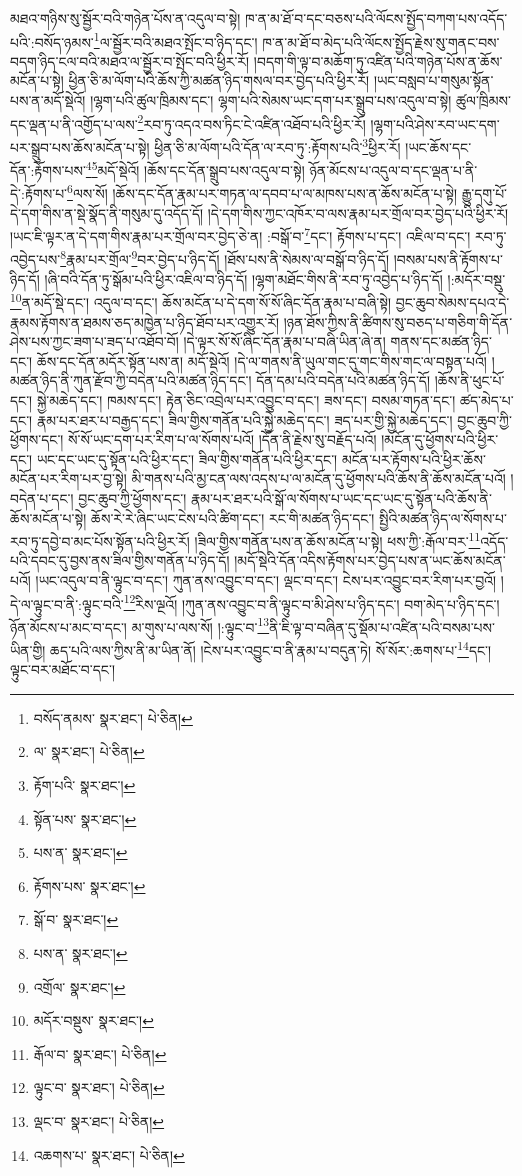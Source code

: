 མཐའ་གཉིས་སུ་སྦྱོར་བའི་གཉེན་པོས་ན་འདུལ་བ་སྟེ། ཁ་ན་མ་ཐོ་བ་དང་བཅས་པའི་ལོངས་སྤྱོད་བཀག་པས་འདོད་པའི་:བསོད་ཉམས་\footnote{བསོད་ནམས་  སྣར་ཐང་།  པེ་ཅིན། }ལ་སྦྱོར་བའི་མཐའ་སྤོང་བ་ཉིད་དང་། ཁ་ན་མ་ཐོ་བ་མེད་པའི་ལོངས་སྤྱོད་རྗེས་སུ་གནང་བས་བདག་ཉིད་ངལ་བའི་མཐའ་ལ་སྦྱོར་བ་སྤོང་བའི་ཕྱིར་རོ། །བདག་གི་ལྟ་བ་མཆོག་ཏུ་འཛིན་པའི་གཉེན་པོས་ན་ཆོས་མངོན་པ་སྟེ། ཕྱིན་ཅི་མ་ལོག་པའི་ཆོས་ཀྱི་མཚན་ཉིད་གསལ་བར་བྱེད་པའི་ཕྱིར་རོ། །ཡང་བསླབ་པ་གསུམ་སྟོན་པས་ན་མདོ་སྡེའོ། །ལྷག་པའི་ཚུལ་ཁྲིམས་དང་། ལྷག་པའི་སེམས་ཡང་དག་པར་སྒྲུབ་པས་འདུལ་བ་སྟེ། ཚུལ་ཁྲིམས་དང་ལྡན་པ་ནི་འགྱོད་པ་ལས་\footnote{ལ་  སྣར་ཐང་།  པེ་ཅིན། }རབ་ཏུ་འདའ་བས་ཏིང་ངེ་འཛིན་འཐོབ་པའི་ཕྱིར་རོ། །ལྷག་པའི་ཤེས་རབ་ཡང་དག་པར་སྒྲུབ་པས་ཆོས་མངོན་པ་སྟེ། ཕྱིན་ཅི་མ་ལོག་པའི་དོན་ལ་རབ་ཏུ་:རྟོགས་པའི་\footnote{རྟོག་པའི་  སྣར་ཐང་། }ཕྱིར་རོ། །ཡང་ཆོས་དང་དོན་:རྟོགས་པས་\footnote{སྟོན་པས་  སྣར་ཐང་། }\footnote{པས་ན་  སྣར་ཐང་། }མདོ་སྡེའོ། །ཆོས་དང་དོན་སྒྲུབ་པས་འདུལ་བ་སྟེ། ཉོན་མོངས་པ་འདུལ་བ་དང་ལྡན་པ་ནི་དེ་:རྟོགས་པ་\footnote{རྟོགས་པས་  སྣར་ཐང་། }ལས་སོ། །ཆོས་དང་དོན་རྣམ་པར་གཏན་ལ་དབབ་པ་ལ་མཁས་པས་ན་ཆོས་མངོན་པ་སྟེ། རྒྱུ་དགུ་པོ་དེ་དག་གིས་ན་སྡེ་སྣོད་ནི་གསུམ་དུ་འདོད་དོ། །དེ་དག་གིས་ཀྱང་འཁོར་བ་ལས་རྣམ་པར་གྲོལ་བར་བྱེད་པའི་ཕྱིར་རོ། །ཡང་ཇི་ལྟར་ན་དེ་དག་གིས་རྣམ་པར་གྲོལ་བར་བྱེད་ཅེ་ན། :བསྒོ་བ་\footnote{སྒོ་བ་  སྣར་ཐང་། }དང་། རྟོགས་པ་དང་། འཇིལ་བ་དང་། རབ་ཏུ་འབྱེད་པས་\footnote{པས་ན་  སྣར་ཐང་། }རྣམ་པར་གྲོལ་\footnote{འགྲོལ་  སྣར་ཐང་། }བར་བྱེད་པ་ཉིད་དོ། །ཐོས་པས་ནི་སེམས་ལ་བསྒོ་བ་ཉིད་དོ། །བསམ་པས་ནི་རྟོགས་པ་ཉིད་དོ། །ཞི་བའི་དོན་ཏུ་སྒོམ་པའི་ཕྱིར་འཇིལ་བ་ཉིད་དོ། །ལྷག་མཐོང་གིས་ནི་རབ་ཏུ་འབྱེད་པ་ཉིད་དོ། །:མདོར་བསྡུ་\footnote{མདོར་བསྡུས་  སྣར་ཐང་། }ན་མདོ་སྡེ་དང་། འདུལ་བ་དང་། ཆོས་མངོན་པ་དེ་དག་སོ་སོ་ཞིང་དོན་རྣམ་པ་བཞི་སྟེ། བྱང་ཆུབ་སེམས་དཔའ་དེ་རྣམས་རྟོགས་ན་ཐམས་ཅད་མཁྱེན་པ་ཉིད་ཐོབ་པར་འགྱུར་རོ། །ཉན་ཐོས་ཀྱིས་ནི་ཚིགས་སུ་བཅད་པ་གཅིག་གི་དོན་ཤེས་པས་ཀྱང་ཟག་པ་ཟད་པ་འཐོབ་བོ། །དེ་ལྟར་སོ་སོ་ཞིང་དོན་རྣམ་པ་བཞི་ཡིན་ཞེ་ན། གནས་དང་མཚན་ཉིད་དང་། ཆོས་དང་དོན་མདོར་སྟོན་པས་ན། མདོ་སྡེའོ། །དེ་ལ་གནས་ནི་ཡུལ་གང་དུ་གང་གིས་གང་ལ་བསྟན་པའོ། །མཚན་ཉིད་ནི་ཀུན་རྫོབ་ཀྱི་བདེན་པའི་མཚན་ཉིད་དང་། དོན་དམ་པའི་བདེན་པའི་མཚན་ཉིད་དོ། །ཆོས་ནི་ཕུང་པོ་དང་། སྐྱེ་མཆེད་དང་། ཁམས་དང་། རྟེན་ཅིང་འབྲེལ་པར་འབྱུང་བ་དང་། ཟས་དང་། བསམ་གཏན་དང་། ཚད་མེད་པ་དང་། རྣམ་པར་ཐར་པ་བརྒྱད་དང་། ཟིལ་གྱིས་གནོན་པའི་སྐྱེ་མཆེད་དང་། ཟད་པར་གྱི་སྐྱེ་མཆེད་དང་། བྱང་ཆུབ་ཀྱི་ཕྱོགས་དང་། སོ་སོ་ཡང་དག་པར་རིག་པ་ལ་སོགས་པའོ། །དོན་ནི་རྗེས་སུ་བརྗོད་པའོ། །མངོན་དུ་ཕྱོགས་པའི་ཕྱིར་དང་། ཡང་དང་ཡང་དུ་སྟོན་པའི་ཕྱིར་དང་། ཟིལ་གྱིས་གནོན་པའི་ཕྱིར་དང་། མངོན་པར་རྟོགས་པའི་ཕྱིར་ཆོས་མངོན་པར་རིག་པར་བྱ་སྟེ། མི་གནས་པའི་མྱ་ངན་ལས་འདས་པ་ལ་མངོན་དུ་ཕྱོགས་པའི་ཆོས་ནི་ཆོས་མངོན་པའོ། །བདེན་པ་དང་། བྱང་ཆུབ་ཀྱི་ཕྱོགས་དང་། རྣམ་པར་ཐར་པའི་སྒོ་ལ་སོགས་པ་ཡང་དང་ཡང་དུ་སྟོན་པའི་ཆོས་ནི་ཆོས་མངོན་པ་སྟེ། ཆོས་རེ་རེ་ཞིང་ཡང་ངེས་པའི་ཚིག་དང་། རང་གི་མཚན་ཉིད་དང་། སྤྱིའི་མཚན་ཉིད་ལ་སོགས་པ་རབ་ཏུ་དབྱེ་བ་མང་པོས་སྟོན་པའི་ཕྱིར་རོ། །ཟིལ་གྱིས་གནོན་པས་ན་ཆོས་མངོན་པ་སྟེ། ཕས་ཀྱི་:རྒོལ་བར་\footnote{རྒོལ་བ་  སྣར་ཐང་།  པེ་ཅིན། }འདོད་པའི་དབང་དུ་བྱས་ནས་ཟིལ་གྱིས་གནོན་པ་ཉིད་དོ། །མདོ་སྡེའི་དོན་འདིས་རྟོགས་པར་བྱེད་པས་ན་ཡང་ཆོས་མངོན་པའོ། །ཡང་འདུལ་བ་ནི་ལྟུང་བ་དང་། ཀུན་ནས་འབྱུང་བ་དང་། ལྡང་བ་དང་། ངེས་པར་འབྱུང་བར་རིག་པར་བྱའོ། །དེ་ལ་ལྟུང་བ་ནི་:ལྟུང་བའི་\footnote{ལྟུང་བ་  སྣར་ཐང་།  པེ་ཅིན། }རིས་ལྔའོ། །ཀུན་ནས་འབྱུང་བ་ནི་ལྟུང་བ་མི་ཤེས་པ་ཉིད་དང་། བག་མེད་པ་ཉིད་དང་། ཉོན་མོངས་པ་མང་བ་དང་། མ་གུས་པ་ལས་སོ། །:ལྟུང་བ་\footnote{ལྡང་བ་  སྣར་ཐང་།  པེ་ཅིན། }ནི་ཇི་ལྟ་བ་བཞིན་དུ་སྡོམ་པ་འཛིན་པའི་བསམ་པས་ཡིན་གྱི། ཆད་པའི་ལས་ཀྱིས་ནི་མ་ཡིན་ནོ། །ངེས་པར་འབྱུང་བ་ནི་རྣམ་པ་བདུན་ཏེ། སོ་སོར་:ཆགས་པ་\footnote{འཆགས་པ་  སྣར་ཐང་།  པེ་ཅིན། }དང་། ལྟུང་བར་མཐོང་བ་དང་། 